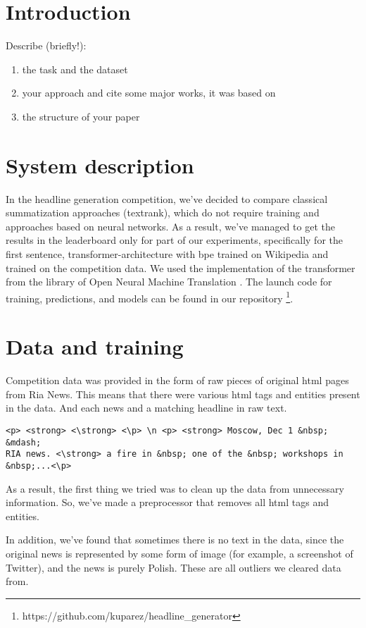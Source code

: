 \documentclass{dialogue}
\begin{document}

\section{Introduction}
Describe (briefly!):
\begin{enumerate}
    \item the task and the dataset
    \item your approach and cite some major works, it was based on
    \item the structure of your paper
\end{enumerate}

\section{System description}
In the headline generation competition, we've decided to compare classical summatization approaches (textrank), which do not require training and approaches based on neural networks. As a result, we've managed to get the results in the leaderboard only for part of our experiments, specifically for the first sentence, transformer-architecture with bpe \cite{} trained on Wikipedia \cite{} and trained on the competition data. We used the implementation of the transformer from the library of Open Neural Machine Translation \cite{}. The launch code for training, predictions, and models can be found in our repository \footnote{https://github.com/kuparez/headline\_generator}.

\section{Data and training}
Competition data was provided in the form of raw pieces of original html pages from Ria News. This means that there were various html tags and entities present in the data. And each news and a matching headline in raw text.

\begin{verbatim}
<p> <strong> <\strong> <\p> \n <p> <strong> Moscow, Dec 1 &nbsp; &mdash;
RIA news. <\strong> a fire in &nbsp; one of the &nbsp; workshops in
&nbsp;...<\p>
\end{verbatim}

As a result, the first thing we tried was to clean up the data from unnecessary information. So, we've made a preprocessor that removes all html tags and entities.

In addition, we've found that sometimes there is no text in the data, since the original news is represented by some form of image (for example, a screenshot of Twitter), and the news is purely Polish. These are all outliers we cleared data from.
\end{document}
